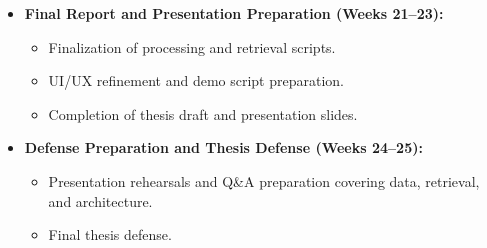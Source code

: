 \begin{itemize}
    \item \textbf{Final Report and Presentation Preparation (Weeks 21--23):}
    \begin{itemize}
        \item Finalization of processing and retrieval scripts.
        \item UI/UX refinement and demo script preparation.
        \item Completion of thesis draft and presentation slides.
    \end{itemize}

    \item \textbf{Defense Preparation and Thesis Defense (Weeks 24--25):}
    \begin{itemize}
        \item Presentation rehearsals and Q\&A preparation covering data, retrieval, and architecture.
        \item Final thesis defense.
    \end{itemize}
\end{itemize}






